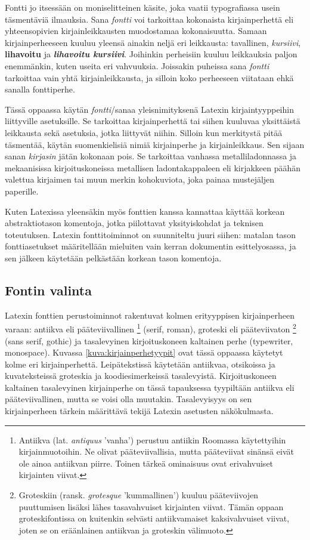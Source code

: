 Fontti jo itsessään on moniselitteinen käsite, joka vaatii typografiassa
usein täsmentäviä ilmauksia. Sana \emph{fontti} voi tarkoittaa
kokonaista kirjainperhettä eli yhteensopivien kirjainleikkausten
muodostamaa kokonaisuutta. Samaan kirjainperheeseen kuuluu yleensä
ainakin neljä eri leikkausta: tavallinen, \textit{kursiivi},
\textbf{lihavoitu} ja \textbf{\textit{lihavoitu kursiivi}}. Joihinkin
perheisiin kuuluu leikkauksia paljon enemmänkin, kuten useita eri
vahvuuksia. Joissakin puheissa sana \emph{fontti} tarkoittaa vain yhtä
kirjainleikkausta, ja silloin koko perheeseen viitataan ehkä sanalla
fonttiperhe.

Tässä oppaassa käytän \emph{fontti}\-/sanaa yleisnimityksenä Latexin
kirjaintyyppeihin liittyville asetuksille. Se tarkoittaa kirjainperhettä
tai siihen kuuluvaa yksittäistä leikkausta sekä asetuksia, jotka
liittyvät niihin. Silloin kun merkitystä pitää täsmentää, käytän
suomenkielisiä nimiä kirjainperhe ja kirjainleikkaus. Sen sijaan sanan
\emph{kirjasin} jätän kokonaan pois. Se tarkoittaa vanhassa
metalliladonnassa ja mekaanisissa kirjoituskoneissa metallisen
ladontakappaleen eli kirjakkeen päähän valettua kirjaimen tai muun
merkin kohokuviota, joka painaa mustejäljen paperille.

Kuten Latexissa yleensäkin myös fonttien kanssa kannattaa käyttää
korkean abstraktiotason komentoja, jotka piilottavat yksityiskohdat ja
teknisen toteutuksen. Latexin fonttitoiminnot on suunniteltu juuri
siihen: matalan tason font\-ti\-ase\-tuk\-set määritellään mieluiten
vain kerran dokumentin esittelyosassa, ja sen jälkeen käytetään
pelkästään korkean tason komentoja.

\subsection{Fontin valinta}

Latexin fonttien perus\-toiminnot rakentuvat kolmen erityyppisen
kirjainperheen varaan: antiikva eli pääteviivallinen%
\footnote{Antiikva (lat. \emph{antiquus} 'vanha') perustuu antiikin
  Roomassa käytettyihin kirjainmuotoihin. Ne olivat pääteviivallisia,
  mutta pääteviivat sinänsä eivät ole ainoa antiikvan piirre. Toinen
  tärkeä ominaisuus ovat erivahvuiset kirjainten viivat.}
(\textenglish{serif, roman}), groteski eli pääteviivaton%
\footnote{Groteskiin (ransk. \emph{grotesque} 'kummallinen') kuuluu
  pääteviivojen puuttumisen lisäksi lähes tasavahvuiset kirjainten
  viivat. Tämän oppaan groteskifontissa on kuitenkin selvästi
  antiikvamaiset kaksivahvuiset viivat, joten se on eräänlainen
  antiikvan ja groteskin välimuoto.} (\textenglish{sans serif, gothic})
ja tasalevyinen kirjoituskoneen kaltainen perhe
(\textenglish{typewriter, monospace}). Kuvassa
\ref{kuva:kirjainperhetyypit} ovat tässä oppaassa käytetyt kolme eri
kirjainperhettä. Leipätekstissä käytetään antiikvaa, otsikoissa ja
kuvateksteissä groteskia ja koodi\-esi\-mer\-keis\-sä tasalevyistä.
Kirjoituskoneen kaltainen tasalevyinen kirjainperhe on tässä tapauksessa
tyypiltään antiikva eli pääteviivallinen, mutta se voisi olla muutakin.
Tasalevyisyys on sen kirjainperheen tärkein määrittävä tekijä Latexin
asetusten näkökulmasta.

